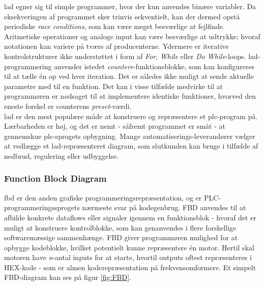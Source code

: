 \noindent \gls{lad} egner sig til simple programmer, hvor der kun anvendes binære variabler. Da eksekveringen af programmet sker trinvis sekventielt, kan der dermed opstå periodiske \textit{race conditions}, som kan være meget besværlige at fejlfinde. Aritmetiske operationer og analoge input kan være besværlige at udtrykke; hvoraf notationen kan variere på tværs af producenterne. Ydermere er iterative kontrolstrukturer ikke understøttet i form af \textit{For}, \textit{While} eller \textit{Do While}-loops. \gls{lad}-programmering anvender istedet \textit{countere}-funktionsblokke, som kan konfigureres til at tælle én op ved hver iteration. Det er således ikke muligt at sende aktuelle parametre med til en funktion. Det kan i visse tilfælde medvirke til at programmøren er nødsaget til at implementere identiske funktioner, hvorved den eneste forskel er counterens \textit{preset}-værdi. \\

\noindent \gls{lad} er den mest populære måde at konstruere og repræsentere et \gls{plc}-program på. Lærbarheden er høj, og det er nemt - såfremt programmet er småt - at gennemskue \gls{plc}-sprogets opbygning. Mange automatiserings-leverandører vælger at vedlægge et \gls{lad}-repræsenteret diagram, som slutkunden kan bruge i tilfælde af nedbrud, regulering eller udbyggelse. \cite{FDB_desc}

\subsubsection{Function Block Diagram}
\gls{fbd} er den anden grafiske programmeringsrepræsentation, og er PLC-programmeringssprogets nærmeste svar på kodegenbrug. FBD anvendes til at afbilde konkrete dataflows eller signaler igennem en funktionsblok - hvoraf det er muligt at konstruere kontrolblokke, som kan genanvendes i flere forskellige softwaremæssige sammenhænge. FBD giver programmøren mulighed for at opbygge kodeblokke, hvilket potentielt kunne repræsentere én motor. Hertil skal motoren have \textit{n}-antal inputs for at starte, hvortil outputs oftest repræsenteres i HEX-kode - som er almen koderepræsentation på frekvensomformere. Et simpelt FBD-diagram kan ses på figur \ref{fig:FBD}.

